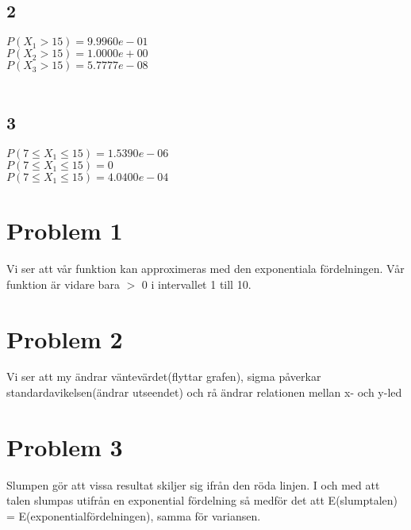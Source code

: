 \documentclass{article}
\begin{document}
\subsection*{2}
  $ P(X_1 > 15) = 9.9960e-01 $\\
  $ P(X_2 > 15) = 1.0000e+00 $\\
  $ P(X_3 > 15) = 5.7777e-08 $\\
  \\
\subsection*{3}
  $ P(7 \le X_1 \le 15) = 1.5390e-06 $\\ 
  $ P(7 \le X_1 \le 15) = 0 $ \\
  $ P(7 \le X_1 \le 15) = 4.0400e-04 $
   
\section*{Problem 1}
Vi ser att vår funktion kan approximeras med den exponentiala fördelningen. Vår
funktion är vidare bara $>$ 0 i intervallet 1 till 10.
\\
\section*{Problem 2}
Vi ser att my ändrar väntevärdet(flyttar grafen), sigma påverkar
standardavikelsen(ändrar utseendet) och rå ändrar relationen mellan x- och
y-led
\\
\section*{Problem 3}
Slumpen gör att vissa resultat skiljer sig ifrån den röda linjen. I och med att
talen slumpas utifrån en exponential fördelning så medför det att E(slumptalen)
= E(exponentialfördelningen), samma för variansen.

\section*{Problem 4}
\subsection*{Problem 4a}
Det ser ut som förväntat eftersom teorin är att när antalet försök går mot
oändligheten kommer medelvärdet konvergera mot väntevärdet(i detta fall 0.5).
\subsection*{Problem 4b}
N är antalet oberoende stokastiska variabler. 
\end{document}

